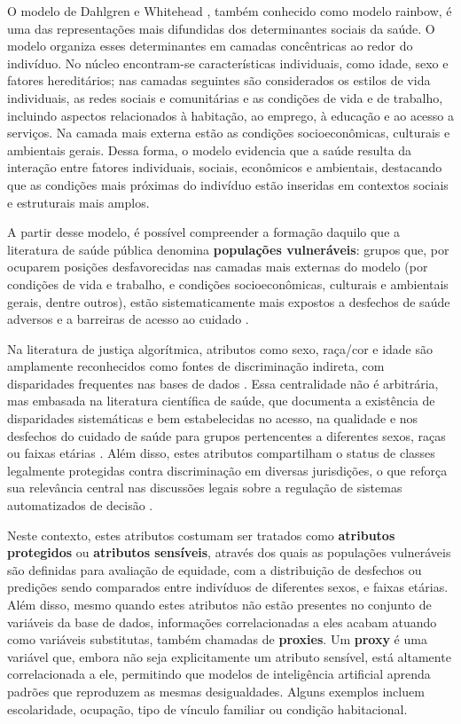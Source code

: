 O modelo de Dahlgren e Whitehead \cite{dahlgren1991policies}, também conhecido como modelo rainbow, é uma das representações mais difundidas dos determinantes sociais da saúde. O modelo organiza esses determinantes em camadas concêntricas ao redor do indivíduo. No núcleo encontram-se características individuais, como idade, sexo e fatores hereditários; nas camadas seguintes são considerados os estilos de vida individuais, as redes sociais e comunitárias e as condições de vida e de trabalho, incluindo aspectos relacionados à habitação, ao emprego, à educação e ao acesso a serviços. Na camada mais externa estão as condições socioeconômicas, culturais e ambientais gerais. Dessa forma, o modelo evidencia que a saúde resulta da interação entre fatores individuais, sociais, econômicos e ambientais, destacando que as condições mais próximas do indivíduo estão inseridas em contextos sociais e estruturais mais amplos.

A partir desse modelo, é possível compreender a formação daquilo que a literatura de saúde pública denomina \textbf{populações vulneráveis}: grupos que, por ocuparem posições desfavorecidas nas camadas mais externas do modelo (por condições de vida e trabalho, e condições socioeconômicas, culturais e ambientais gerais, dentre outros), estão sistematicamente mais expostos a desfechos de saúde adversos e a barreiras de acesso ao cuidado \cite{flaskerud1998conceptualizing}.

Na literatura de justiça algorítmica, atributos como sexo, raça/cor e idade são amplamente reconhecidos como fontes de discriminação indireta, com disparidades frequentes nas bases de dados \cite{mehrabi2021survey}. Essa centralidade não é arbitrária, mas embasada na literatura científica de saúde, que documenta a existência de disparidades sistemáticas e bem estabelecidas no acesso, na qualidade e nos desfechos do cuidado de saúde para grupos pertencentes a diferentes sexos, raças ou faixas etárias \cite{nelson2002unequal,mauvais2020sex}. Além disso, estes atributos compartilham o status de classes legalmente protegidas contra discriminação em diversas jurisdições, o que reforça sua relevância central nas discussões legais sobre a regulação de sistemas automatizados de decisão \cite{barocas2016big}.

Neste contexto, estes atributos costumam ser tratados como \textbf{atributos protegidos} ou \textbf{atributos sensíveis}, através dos quais as populações vulneráveis são definidas para avaliação de equidade, com a distribuição de desfechos ou predições sendo comparados entre indivíduos de diferentes sexos, e faixas etárias. Além disso, mesmo quando estes atributos não estão presentes no conjunto de variáveis da base de dados, informações correlacionadas a eles acabam atuando como variáveis substitutas, também chamadas de \textbf{proxies}.
Um \textbf{proxy} é uma variável que, embora não seja explicitamente um atributo sensível, está altamente correlacionada a ele, permitindo que modelos de inteligência artificial aprenda padrões que reproduzem as mesmas desigualdades. Alguns exemplos incluem escolaridade, ocupação, tipo de vínculo familiar ou condição habitacional.

